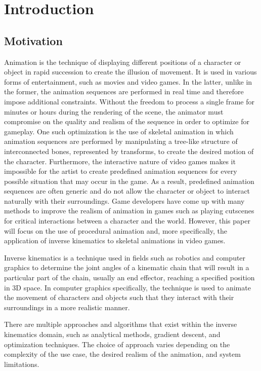 \chapter{Introduction}
\section{Motivation} 
Animation is the technique of displaying different positions of a character or
object in rapid succession to create the illusion of movement. It is used in
various forms of entertainment, such as movies and video games. In the latter,
unlike in the former, the animation sequences are performed in real time and
therefore impose additional constraints. Without the freedom to process a single
frame for minutes or hours during the rendering of the scene, the animator must
compromise on the quality and realism of the sequence in order to optimize for
gameplay. One such optimization is the use of skeletal animation in which
animation sequences are performed by manipulating a tree-like structure of
interconnected bones, represented by transforms, to create the desired motion of
the character. Furthermore, the interactive nature of video games makes it
impossible for the artist to create predefined animation sequences for every
possible situation that may occur in the game. As a result, predefined animation
sequences are often generic and do not allow the character or object to interact
naturally with their surroundings. Game developers have come up with many
methods to improve the realism of animation in games such as playing cutscenes
for critical interactions between a character and the world. However, this paper
will focus on the use of procedural animation and, more specifically, the
application of inverse kinematics to skeletal animations in video games.

Inverse kinematics is a technique used in fields such as robotics and computer
graphics to determine the joint angles of a kinematic chain that will result in
a particular part of the chain, usually an end effector, reaching a specified
position in 3D space. In computer graphics specifically, the technique is used
to animate the movement of characters and objects such that they interact with
their surroundings in a more realistic manner. 

There are multiple approaches and algorithms that exist within the inverse
kinematics domain, such as analytical methods, gradient descent, and
optimization techniques. The choice of approach varies depending on the
complexity of the use case, the desired realism of the animation, and system
limitations.

